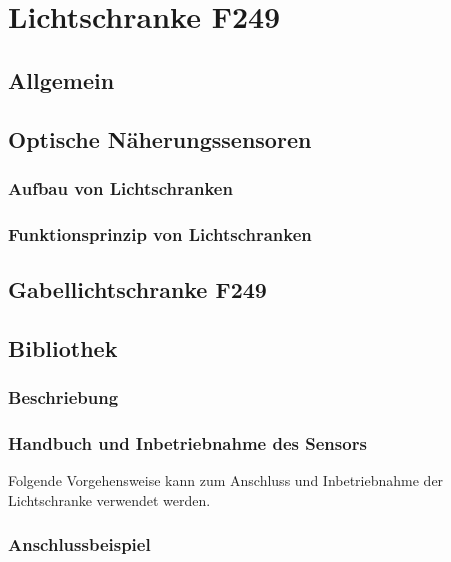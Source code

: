 %
%

\chapter{Lichtschranke F249}
\section{Allgemein}




\section{Optische Näherungssensoren}

\subsection{Aufbau von Lichtschranken}


\subsection{Funktionsprinzip von Lichtschranken}





\section{Gabellichtschranke F249}
\section{Bibliothek}
\subsection{Beschriebung}

\subsection{Handbuch und Inbetriebnahme des Sensors}
Folgende Vorgehensweise kann zum Anschluss und Inbetriebnahme der Lichtschranke verwendet werden. 


\subsection{Anschlussbeispiel}




